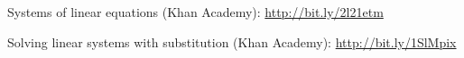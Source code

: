 \begin{readinessAssuranceResources}
\item Systems of linear equations (Khan Academy):
      \url{http://bit.ly/2l21etm}
\item Solving linear systems with substitution (Khan Academy):
      \url{http://bit.ly/1SlMpix}
\end{readinessAssuranceResources}
